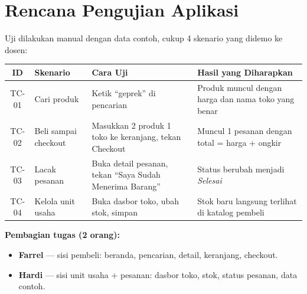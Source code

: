 \documentclass[11pt, a4paper]{article}
\begin{document}
\clearpage

\section{Rencana Pengujian Aplikasi}

Uji dilakukan manual dengan data contoh, cukup 4 skenario yang didemo ke dosen:

\vspace{0.1cm}
\noindent\small
\begin{tabularx}{\textwidth}{@{} c >{\raggedright\arraybackslash}p{3cm} >{\raggedright\arraybackslash}p{4.5cm} >{\raggedright\arraybackslash}X @{}}
\toprule
\textbf{ID} & \textbf{Skenario} & \textbf{Cara Uji} & \textbf{Hasil yang Diharapkan} \\
\midrule
TC-01 & Cari produk &
  Ketik ``geprek'' di pencarian &
  Produk muncul dengan harga dan nama toko yang benar \\
\addlinespace
TC-02 & Beli sampai checkout &
  Masukkan 2 produk 1 toko ke keranjang, tekan Checkout &
  Muncul 1 pesanan dengan total = harga + ongkir \\
\addlinespace
TC-03 & Lacak pesanan &
  Buka detail pesanan, tekan ``Saya Sudah Menerima Barang'' &
  Status berubah menjadi \textit{Selesai} \\
\addlinespace
TC-04 & Kelola unit usaha &
  Buka dasbor toko, ubah stok, simpan &
  Stok baru langsung terlihat di katalog pembeli \\
\bottomrule
\end{tabularx}

\vspace{0.4cm}
\normalsize

\noindent\textbf{Pembagian tugas (2 orang):}
\begin{itemize}
  \item \textbf{Farrel} --- sisi pembeli: beranda, pencarian, detail, keranjang, checkout.
  \item \textbf{Hardi} --- sisi unit usaha + pesanan: dasbor toko, stok, status pesanan, data contoh.
\end{itemize}
\end{document}
